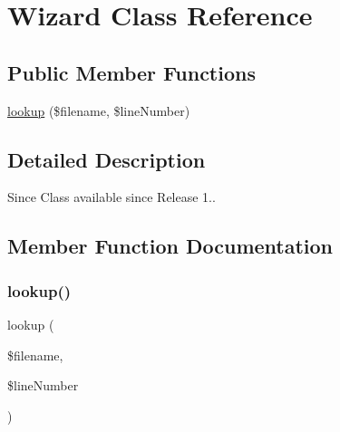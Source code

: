\hypertarget{class_sebastian_bergmann_1_1_code_unit_reverse_lookup_1_1_wizard}{}\section{Wizard Class Reference}
\label{class_sebastian_bergmann_1_1_code_unit_reverse_lookup_1_1_wizard}
\subsection*{Public Member Functions}
\begin{DoxyCompactItemize}
\item 
\mbox{\hyperlink{class_sebastian_bergmann_1_1_code_unit_reverse_lookup_1_1_wizard_aaf8e4bcd568590dc064785acd523059e}{lookup}} (\$filename, \$line\+Number)
\end{DoxyCompactItemize}


\subsection{Detailed Description}
\begin{DoxySince}{Since}
Class available since Release 1.. 
\end{DoxySince}


\subsection{Member Function Documentation}
\mbox{\label{class_sebastian_bergmann_1_1_code_unit_reverse_lookup_1_1_wizard_aaf8e4bcd568590dc064785acd523059e}} 
\subsubsection{\texorpdfstring{lookup()}{lookup()}}
{\footnotesize\ttfamily lookup (\begin{DoxyParamCaption}\item[{}]{\$filename,  }\item[{}]{\$line\+Number }\end{DoxyParamCaption})}


